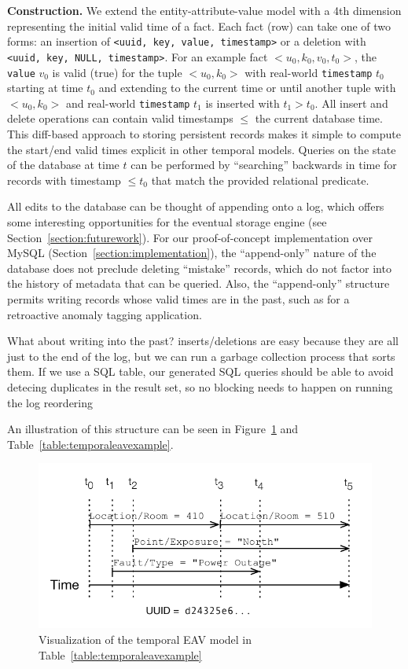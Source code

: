 \textbf{Construction.} We extend the entity-attribute-value model with a 4th dimension representing the initial
valid time of a fact. Each fact (row) can take one of two forms: an insertion of \texttt{<uuid, key, value, timestamp>}
or a deletion with \texttt{<uuid, key, NULL, timestamp>}. For an example fact $<u_0, k_0, v_0, t_0>$, the \texttt{value} $v_0$ is valid (true) for the tuple $<u_0, k_0>$
with real-world \texttt{timestamp} $t_0$ starting at time $t_0$ and extending to the current time or until another
tuple with $<u_0, k_0>$ and real-world \texttt{timestamp} $t_1$ is inserted with $t_1 > t_0$. All insert and delete operations
can contain valid timestamps $\leq$ the current database time. This diff-based approach
to storing persistent records makes it simple to compute the start/end valid times explicit in other temporal models.
Queries on the state of the database at time $t$ can be performed by ``searching'' backwards in time for 
records with timestamp $\leq t_0$ that match the provided relational predicate.

All edits to the database can be thought of appending onto a log, which offers some interesting opportunities
for the eventual storage engine (see Section~\ref{section:futurework}). For our proof-of-concept implementation
over MySQL (Section~\ref{section:implementation}), the ``append-only'' nature of the database does not preclude
deleting ``mistake'' records, which do not factor into the history of metadata that can be queried. Also,
the ``append-only'' structure permits writing records whose valid times are in the past, such as for a retroactive anomaly
tagging application. 

What about writing into the past? inserts/deletions are easy because they are all just to the end of the log, but
we can run a garbage collection process that sorts them. If we use a SQL table, our generated SQL queries should
be able to avoid detecing duplicates in the result set, so no blocking needs to happen on running the log reordering
\fi

An illustration of this structure can be seen in Figure~\ref{figure:temporaleavexample} and Table~\ref{table:temporaleavexample}.

\begin{figure}
\centering
\includegraphics[width=.9\linewidth]{figs/time.pdf}
\caption{Visualization of the temporal EAV model in Table~\ref{table:temporaleavexample}}
\label{figure:temporaleavexample}
\end{figure}

